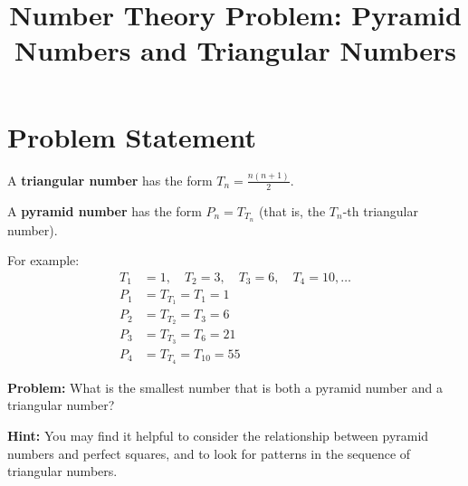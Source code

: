 \documentclass[12pt]{article}
\title{Number Theory Problem: Pyramid Numbers and Triangular Numbers}
\author{}
\date{}
\begin{document}
\maketitle

\section*{Problem Statement}

A \textbf{triangular number} has the form $T_n = \frac{n(n+1)}{2}$.

A \textbf{pyramid number} has the form $P_n = T_{T_n}$ (that is, the $T_n$-th triangular number).

For example:
\begin{align}
T_1 &= 1, \quad T_2 = 3, \quad T_3 = 6, \quad T_4 = 10, \ldots \\
P_1 &= T_{T_1} = T_1 = 1 \\
P_2 &= T_{T_2} = T_3 = 6 \\
P_3 &= T_{T_3} = T_6 = 21 \\
P_4 &= T_{T_4} = T_{10} = 55
\end{align}

\textbf{Problem:} What is the smallest number that is both a pyramid number and a triangular number?

\vspace{0.5cm}

\textbf{Hint:} You may find it helpful to consider the relationship between pyramid numbers and perfect squares, and to look for patterns in the sequence of triangular numbers.
\end{document}
